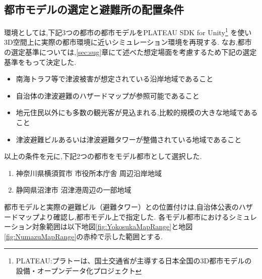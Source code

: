 \subsection{都市モデルの選定と避難所の配置条件}
環境としては,下記3つの都市の都市モデルをPLATEAU SDK for Unity\footnote{
  PLATEAU:プラトーは、国土交通省が主導する日本全国の3D都市モデルの設備・オープンデータ化プロジェクト
}
を使い3D空間上に実際の都市環境に近いシミュレーション環境を再現する.
なお,都市の選定基準については,\ref{sec:sug}章にて述べた想定場面を考慮するため下記の選定基準をもって決定した.
\begin{itemize}
  \item 南海トラフ等で津波被害が想定されている沿岸地域であること
  \item 自治体の津波避難のハザードマップが参照可能であること
  \item 地元住民以外にも多数の観光客が見込まれる,比較的規模の大きな地域であること
  \item 津波避難ビルあるいは津波避難タワーが整備されている地域であること
\end{itemize}
以上の条件を元に,下記2つの都市をモデル都市として選択した.
\begin{enumerate}
  \item 神奈川県横須賀市 市役所本庁舎 周辺沿岸地域
  \item 静岡県沼津市 沼津港周辺の一部地域
\end{enumerate}
都市モデルと実際の避難ビル（避難タワー）との位置付けは,自治体公表のハザードマップ\cite{yokosukaHazardMap}\cite{numazuHazardMap}より確認し,都市モデル上で指定した.
各モデル都市におけるシミュレーション対象範囲は以下地図\ref{fig:YokosukaMapRange}と地図\ref{fig:NumazuMapRange}の赤枠で示した範囲とする.
